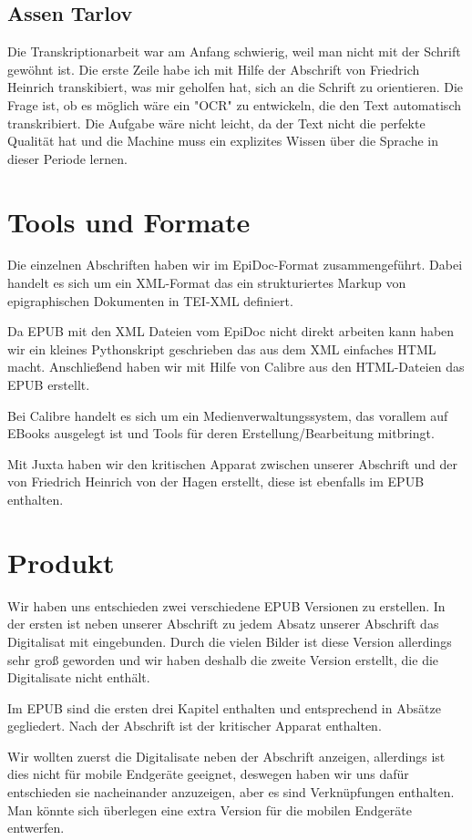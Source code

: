 \documentclass[a4paper, 12pt, oneside]{scrbook}
\begin{document}
\subsection{Assen Tarlov}

Die Transkriptionarbeit war am Anfang schwierig, weil man nicht mit der Schrift gewöhnt ist. Die erste Zeile habe ich mit Hilfe der Abschrift von Friedrich Heinrich transkibiert, was mir geholfen hat, sich an die Schrift zu orientieren. Die Frage ist, ob es möglich wäre ein "OCR" zu entwickeln, die den Text automatisch transkribiert. Die Aufgabe wäre nicht leicht, da der Text nicht die perfekte Qualität hat und die Machine muss ein explizites Wissen über die Sprache in dieser Periode lernen.

\section{Tools und Formate}
Die einzelnen Abschriften haben wir im EpiDoc-Format zusammengeführt. Dabei handelt es sich um ein XML-Format das ein strukturiertes Markup von epigraphischen Dokumenten in TEI-XML definiert.

Da EPUB mit den XML Dateien vom EpiDoc nicht direkt arbeiten kann haben wir ein kleines Pythonskript geschrieben das aus dem XML einfaches HTML macht. Anschließend haben wir mit Hilfe von Calibre aus den HTML-Dateien das EPUB erstellt.

Bei Calibre\cite{calibre} handelt es sich um ein Medienverwaltungssystem, das vorallem auf EBooks ausgelegt ist und Tools für deren Erstellung/Bearbeitung mitbringt.

Mit Juxta\cite{juxta} haben wir den kritischen Apparat zwischen unserer Abschrift und der von  Friedrich Heinrich von der Hagen erstellt, diese ist ebenfalls im EPUB enthalten.
\section{Produkt}
Wir haben uns entschieden zwei verschiedene EPUB Versionen zu erstellen. In der ersten ist neben unserer Abschrift zu jedem Absatz unserer Abschrift das Digitalisat mit eingebunden. Durch die vielen Bilder ist diese Version allerdings sehr groß geworden und wir haben deshalb die zweite Version erstellt, die die Digitalisate nicht enthält.

Im EPUB sind die ersten drei Kapitel enthalten und entsprechend in Absätze gegliedert. Nach der Abschrift ist der kritischer Apparat enthalten.

Wir wollten zuerst die Digitalisate neben der Abschrift anzeigen, allerdings ist dies nicht für mobile Endgeräte geeignet, deswegen haben wir uns dafür entschieden sie nacheinander anzuzeigen, aber es sind Verknüpfungen enthalten. Man könnte sich überlegen eine extra Version für die mobilen Endgeräte entwerfen.
\end{document}
